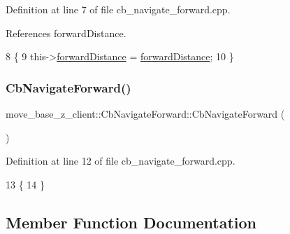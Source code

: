 Definition at line 7 of file cb\+\_\+navigate\+\_\+forward.\+cpp.



References forward\+Distance.


\begin{DoxyCode}
8 \{
9     this->\hyperlink{classmove__base__z__client_1_1CbNavigateForward_ab3097d686b5a82b4f650bc5175d8ab73}{forwardDistance} = \hyperlink{classmove__base__z__client_1_1CbNavigateForward_ab3097d686b5a82b4f650bc5175d8ab73}{forwardDistance};
10 \}
\end{DoxyCode}
\mbox{\label{classmove__base__z__client_1_1CbNavigateForward_a9acd20b586f4b5892af7e01d8ddf309c}} 
\subsubsection{\texorpdfstring{Cb\+Navigate\+Forward()}{CbNavigateForward()}\hspace{0.1cm}{\footnotesize\ttfamily [2/2]}}
{\footnotesize\ttfamily move\+\_\+base\+\_\+z\+\_\+client\+::\+Cb\+Navigate\+Forward\+::\+Cb\+Navigate\+Forward (\begin{DoxyParamCaption}{ }\end{DoxyParamCaption})}



Definition at line 12 of file cb\+\_\+navigate\+\_\+forward.\+cpp.


\begin{DoxyCode}
13 \{
14 \}
\end{DoxyCode}


\subsection{Member Function Documentation}
\mbox{\label{classmove__base__z__client_1_1CbNavigateForward_ab167238d60578809027d4649a4eea536}} 
